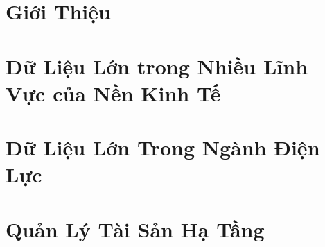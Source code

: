 \documentclass[utf8]{frontiersSCNS} %
\begin{document}
\section{Giới Thiệu}



\section{Dữ Liệu Lớn trong Nhiều Lĩnh Vực của Nền Kinh Tế}




\section{Dữ Liệu Lớn Trong Ngành Điện Lực}



\section{Quản Lý Tài Sản Hạ Tầng}



\section{}









\end{document}
